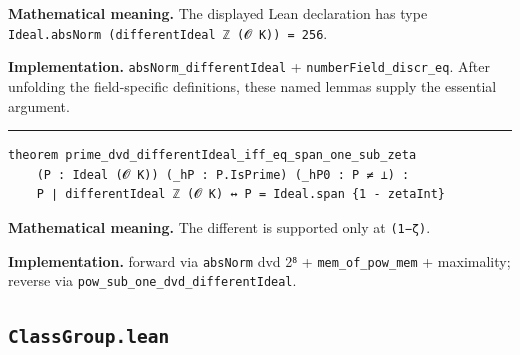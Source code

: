 \documentclass[UTF8,a4paper,11pt,fontset=fandol]{ctexart}
\theoremstyle{definition}
\newcommand{\statementsep}{\par\medskip\hrule\medskip}
\begin{document}
\noindent\textbf{Mathematical meaning.} The displayed Lean declaration has type \texttt{Ideal.\allowbreak{}absNorm (differentIdeal ℤ (𝓞 K)) = 256}.\par
\noindent\textbf{Implementation.} \texttt{absNorm\_\allowbreak{}differentIdeal} + \texttt{numberField\_\allowbreak{}discr\_\allowbreak{}eq}. After unfolding the field-specific definitions, these named lemmas supply the essential argument.\par
\statementsep
\begin{verbatim}
theorem prime_dvd_differentIdeal_iff_eq_span_one_sub_zeta
    (P : Ideal (𝓞 K)) (_hP : P.IsPrime) (_hP0 : P ≠ ⊥) :
    P ∣ differentIdeal ℤ (𝓞 K) ↔ P = Ideal.span {1 - zetaInt}
\end{verbatim}
\noindent\textbf{Mathematical meaning.} The different is supported only at \texttt{(1−ζ)}.\par
\noindent\textbf{Implementation.} forward via \texttt{absNorm} dvd 2⁸ + \texttt{mem\_\allowbreak{}of\_\allowbreak{}pow\_\allowbreak{}mem} + maximality; reverse via \texttt{pow\_\allowbreak{}sub\_\allowbreak{}one\_\allowbreak{}dvd\_\allowbreak{}differentIdeal}.\par

\subsection{\texttt{ClassGroup.lean}}
\end{document}
